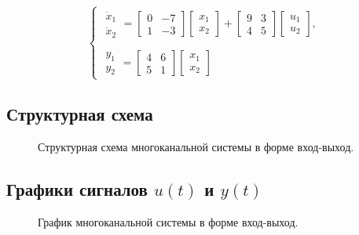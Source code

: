 \documentclass[a5paper, 10pt]{article}
\theoremstyle{definition}
\theoremstyle{plain}
\theoremstyle{remark}
\begin{document}
\begin{equation*}
\begin{cases}
\begin{matrix}
\dot{x}_1\\
\dot{x}_2
\end{matrix} =
\begin{bmatrix}
0 & -7\\
1 & -3
\end{bmatrix}
\begin{bmatrix}
x_1\\
x_2
\end{bmatrix} + 
\begin{bmatrix}
9 & 3\\
4 & 5
\end{bmatrix}
\begin{bmatrix}
u_1\\
u_2
\end{bmatrix},\\\\
\begin{matrix}
y_1\\
y_2
\end{matrix} =
 \begin{bmatrix}
4 & 6\\
5 & 1
\end{bmatrix}
\begin{bmatrix}
x_1\\
x_2
\end{bmatrix}
\end{cases}
\end{equation*}

\subsection{Структурная схема}
\begin{figure}[h]
\caption{Структурная схема многоканальной системы в форме вход-выход.}
\end{figure}


\subsection{Графики сигналов $u(t)$ и $y(t)$}
\begin{figure}[h]
\caption{График многоканальной системы в форме вход-выход.}
\end{figure}
\end{document}
